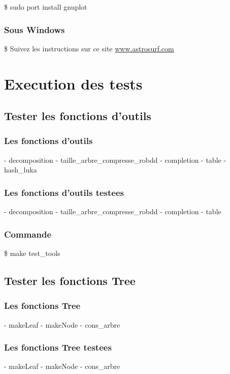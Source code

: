 \documentclass{article}
\begin{document}
\tabto{1cm}\$ sudo port install gnuplot

\subsubsection{Sous Windows}

\tabto{1cm}\$ Suivez les instructions sur ce site \href{http://www.astrosurf.com/buil/isis/lisa_start/howto_gnuplot.htm}{www.astrosurf.com}

\section{Execution des tests}
\subsection{Tester les fonctions d'outils}
\subsubsection{Les fonctions d'outils}
\tabto{1cm} - decomposition
\tabto{1cm} - taille\_arbre\_compresse\_robdd
\tabto{1cm} - completion
\tabto{1cm} - table
\tabto{1cm} - hash\_luka

\subsubsection{Les fonctions d'outils testees}
\tabto{1cm} - decomposition
\tabto{1cm} - taille\_arbre\_compresse\_robdd
\tabto{1cm} - completion
\tabto{1cm} - table

\subsubsection{Commande}
\tabto{1cm}\$ make test\_tools

\subsection{Tester les fonctions Tree}
\subsubsection{Les fonctions Tree}
\tabto{1cm} - makeLeaf
\tabto{1cm} - makeNode
\tabto{1cm} - cons\_arbre


\subsubsection{Les fonctions Tree testees}
\tabto{1cm} - makeLeaf
\tabto{1cm} - makeNode
\tabto{1cm} - cons\_arbre
\end{document}
